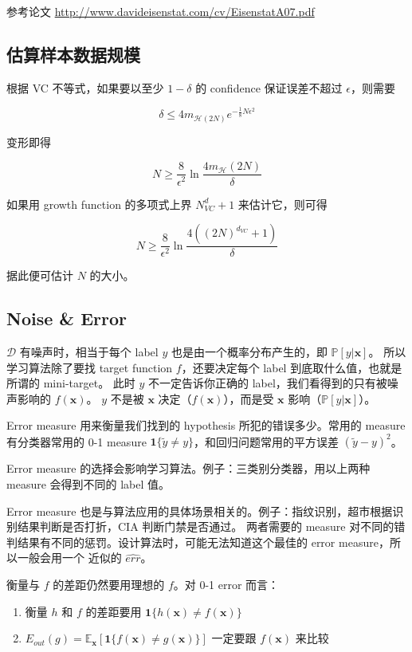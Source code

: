 \documentclass[a4paper]{article}
\begin{document}
参考论文 \href{http://www.davideisenstat.com/cv/EisenstatA07.pdf}{http://www.davideisenstat.com/cv/EisenstatA07.pdf}



\subsection{估算样本数据规模}
根据 VC 不等式，如果要以至少 $1-\delta$ 的 confidence 保证误差不超过 $\epsilon$，则需要

$$\delta \le 4m_{\mathcal{H}(2N)}e^{-\frac{1}{8}N\epsilon^2}$$

变形即得

$$N \ge \frac{8}{\epsilon^2}\ln{\frac{4m_{\mathcal{H}}(2N)}{\delta}}$$

如果用 growth function 的多项式上界 $N^d_{VC} + 1$ 来估计它，则可得

$$N \ge \frac{8}{\epsilon^2}\ln{\frac{4((2N)^{d_{VC}} + 1)}{\delta}}$$

据此便可估计 $N$ 的大小。



\subsection{Noise \& Error}
$\mathcal{D}$ 有噪声时，相当于每个 label $y$ 也是由一个概率分布产生的，即 $\mathbb{P}[y|\mathbf{x}]$。
所以学习算法除了要找 target function $f$，还要决定每个 label 到底取什么值，也就是所谓的 mini-target。
此时 $y$ 不一定告诉你正确的 label，我们看得到的只有被噪声影响的 $f(\mathbf{x})$。
$y$ 不是被 $\mathbf{x}$ 决定（$f(\mathbf{x})$），而是受 $\mathbf{x}$ 影响（$\mathbb{P}[y|\mathbf{x}]$）。

Error measure 用来衡量我们找到的 hypothesis 所犯的错误多少。常用的 measure 有分类器常用的
0-1 measure $\mathbf{1}\{\tilde{y} \neq y\}$，和回归问题常用的平方误差 $(\tilde{y} - y)^2$。

Error measure 的选择会影响学习算法。例子：三类别分类器，用以上两种 measure 会得到不同的 label 值。

Error measure 也是与算法应用的具体场景相关的。例子：指纹识别，超市根据识别结果判断是否打折，CIA 判断门禁是否通过。
两者需要的 measure 对不同的错判结果有不同的惩罚。设计算法时，可能无法知道这个最佳的 error measure，所以一般会用一个
近似的 $\widehat{err}$。


衡量与 $f$ 的差距仍然要用理想的 $f$。对 0-1 error 而言：
 
\begin{enumerate}
  \item 衡量 $h$ 和 $f$ 的差距要用 $\mathbf{1}\{h(\mathbf{x}) \ne f(\mathbf{x})\}$
  \item $E_{out}(g) = \mathbb{E}_{\mathbf{x}}\left[\mathbf{1}\{f(\mathbf{x}) \neq g(\mathbf{x})\}\right]$
  一定要跟 $f(\mathbf{x})$ 来比较
\end{enumerate}
\end{document}
